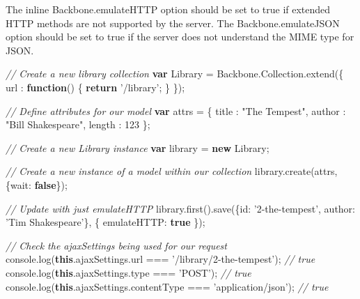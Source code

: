 \documentclass[9pt]{book}
\newenvironment{Shaded}{}{}
\newcommand{\KeywordTok}[1]{\textcolor[rgb]{0.00,0.44,0.13}{\textbf{{#1}}}}
\newcommand{\DataTypeTok}[1]{\textcolor[rgb]{0.56,0.13,0.00}{{#1}}}
\newcommand{\DecValTok}[1]{\textcolor[rgb]{0.25,0.63,0.44}{{#1}}}
\newcommand{\StringTok}[1]{\textcolor[rgb]{0.25,0.44,0.63}{{#1}}}
\newcommand{\CommentTok}[1]{\textcolor[rgb]{0.38,0.63,0.69}{\textit{{#1}}}}
\newcommand{\OtherTok}[1]{\textcolor[rgb]{0.00,0.44,0.13}{{#1}}}
\newcommand{\FunctionTok}[1]{\textcolor[rgb]{0.02,0.16,0.49}{{#1}}}
\newcommand{\NormalTok}[1]{{#1}}
\begin{document}
The inline Backbone.emulateHTTP option should be set to true if extended
HTTP methods are not supported by the server. The Backbone.emulateJSON
option should be set to true if the server does not understand the MIME
type for JSON.

\begin{Shaded}
\begin{Highlighting}[]
\CommentTok{// Create a new library collection}
\KeywordTok{var} \NormalTok{Library = }\OtherTok{Backbone}\NormalTok{.}\OtherTok{Collection}\NormalTok{.}\FunctionTok{extend}\NormalTok{(\{}
    \DataTypeTok{url }\NormalTok{: }\KeywordTok{function}\NormalTok{() \{ }\KeywordTok{return} \StringTok{'/library'}\NormalTok{; \}}
\NormalTok{\});}

\CommentTok{// Define attributes for our model}
\KeywordTok{var} \NormalTok{attrs = \{}
    \DataTypeTok{title  }\NormalTok{: }\StringTok{"The Tempest"}\NormalTok{,}
    \DataTypeTok{author }\NormalTok{: }\StringTok{"Bill Shakespeare"}\NormalTok{,}
    \DataTypeTok{length }\NormalTok{: }\DecValTok{123}
\NormalTok{\};}
  
\CommentTok{// Create a new Library instance}
\KeywordTok{var} \NormalTok{library = }\KeywordTok{new} \NormalTok{Library;}

\CommentTok{// Create a new instance of a model within our collection}
\OtherTok{library}\NormalTok{.}\FunctionTok{create}\NormalTok{(attrs, \{}\DataTypeTok{wait}\NormalTok{: }\KeywordTok{false}\NormalTok{\});}
  
\CommentTok{// Update with just emulateHTTP}
\OtherTok{library}\NormalTok{.}\FunctionTok{first}\NormalTok{().}\FunctionTok{save}\NormalTok{(\{}\DataTypeTok{id}\NormalTok{: }\StringTok{'2-the-tempest'}\NormalTok{, }\DataTypeTok{author}\NormalTok{: }\StringTok{'Tim Shakespeare'}\NormalTok{\}, \{}
  \DataTypeTok{emulateHTTP}\NormalTok{: }\KeywordTok{true}
\NormalTok{\});}
    
\CommentTok{// Check the ajaxSettings being used for our request}
\OtherTok{console}\NormalTok{.}\FunctionTok{log}\NormalTok{(}\KeywordTok{this}\NormalTok{.}\OtherTok{ajaxSettings}\NormalTok{.}\FunctionTok{url} \NormalTok{=== }\StringTok{'/library/2-the-tempest'}\NormalTok{); }\CommentTok{// true}
\OtherTok{console}\NormalTok{.}\FunctionTok{log}\NormalTok{(}\KeywordTok{this}\NormalTok{.}\OtherTok{ajaxSettings}\NormalTok{.}\FunctionTok{type} \NormalTok{=== }\StringTok{'POST'}\NormalTok{); }\CommentTok{// true}
\OtherTok{console}\NormalTok{.}\FunctionTok{log}\NormalTok{(}\KeywordTok{this}\NormalTok{.}\OtherTok{ajaxSettings}\NormalTok{.}\FunctionTok{contentType} \NormalTok{=== }\StringTok{'application/json'}\NormalTok{); }\CommentTok{// true}


\end{Highlighting}
\end{Shaded}
\end{document}
